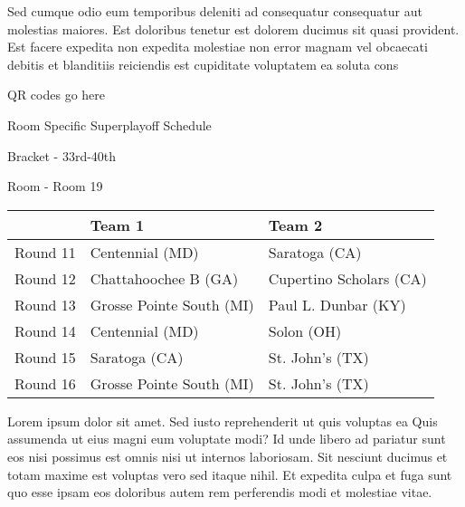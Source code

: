 \documentclass{article}%
\begin{document}
\newline%
    Sed cumque odio eum temporibus deleniti ad consequatur consequatur aut molestias maiores. Est doloribus tenetur est dolorem ducimus sit quasi provident. Est facere expedita non expedita molestiae non error magnam vel obcaecati debitis et blanditiis reiciendis est cupiditate voluptatem ea soluta cons%
\vspace*{140pt}%
\begin{center}%
\begin{Huge}%
QR codes go here%
\end{Huge}%
\end{center}%
\newpage%
\begin{center}%
\begin{Huge}%
Room Specific Superplayoff Schedule%
\end{Huge}%
\vspace*{8pt}%
\linebreak%
\begin{Large}%
Bracket {-} 33rd{-}40th%
\end{Large}%
\vspace*{8pt}%
\linebreak%
\vspace*{8pt}%
\begin{Large}%
Room {-} Room 19%
\end{Large}%
\end{center}%
%
\begin{tabularx}{\textwidth}{|c|Y|Y|}%
\hline%
&Team 1&Team 2\\%
\hline%
Round 11&Centennial (MD)&Saratoga (CA)\\%
Round 12&Chattahoochee B (GA)&Cupertino Scholars (CA)\\%
Round 13&Grosse Pointe South (MI)&Paul L. Dunbar (KY)\\%
Round 14&Centennial (MD)&Solon (OH)\\%
Round 15&Saratoga (CA)&St. John's (TX)\\%
Round 16&Grosse Pointe South (MI)&St. John's (TX)\\%
\hline%
\end{tabularx}%
\vspace*{8pt}%
\newline%
    Lorem ipsum dolor sit amet. Sed iusto reprehenderit ut quis voluptas ea Quis assumenda ut eius magni eum voluptate modi? Id unde libero ad pariatur sunt eos nisi possimus est omnis nisi ut internos laboriosam. Sit nesciunt ducimus et totam maxime est voluptas vero sed itaque nihil. Et expedita culpa et fuga sunt quo esse ipsam eos doloribus autem rem perferendis modi et molestiae vitae.\newline%
\end{document}

